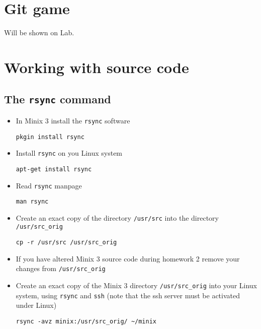 \documentclass{article}
\begin{document}
\section{Git game}
Will be shown on Lab.

\section{Working with source code}

\subsection{The \texttt{rsync} command}
\begin{itemize}
\item In Minix 3 install the \texttt{rsync} software
\begin{verbatim}
pkgin install rsync
\end{verbatim}
\item Install \texttt{rsync} on you Linux system
\begin{verbatim}
apt-get install rsync
\end{verbatim}
\item Read \texttt{rsync} manpage
\begin{verbatim}
man rsync
\end{verbatim}
\item Create an exact copy of the directory \texttt{/usr/src} into the directory \texttt{/usr/src_orig}
\begin{verbatim}
cp -r /usr/src /usr/src_orig
\end{verbatim}
\item If you have altered Minix 3 source code during homework 2 remove your changes from \texttt{/usr/src_orig}
\item Create an exact copy of the Minix 3 directory \texttt{/usr/src_orig} into your Linux system, using \texttt{rsync} and \texttt{ssh} (note that the ssh server must be activated under Linux)
\begin{verbatim}
rsync -avz minix:/usr/src_orig/ ~/minix
\end{verbatim}
\end{itemize}
\end{document}
